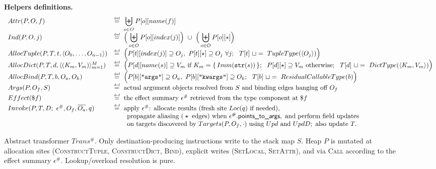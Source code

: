 \begin{figure*}[t]
\vspace{0.3em}
\textbf{Helpers definitions.}
\[
\begin{array}{ll}
Attr(P,O,f) &\defeq\ \displaystyle\biguplus_{o\in O} P[o][name(f)]
\\[0.2em]
Ind(P,O,j) &\defeq\ \displaystyle\Big(\biguplus_{o\in O} P[o][index(j)]\Big)\ \cup\ \Big(\biguplus_{o\in O} P[o][\star]\Big)
\\[0.2em]
AllocTuple(P,T,t,\langle O_0,\ldots,O_{n-1}\rangle)
  &\defeq\ \Big(P[t][index(j)] \supseteq O_j,\ P[t][\star]\supseteq O_j\ \forall j;\ \ T[t]\ \sqcup=\ TupleType(\langle O_j\rangle)\Big)
\\[0.2em]
AllocDict(P,T,d,\langle (K_m,V_m)\rangle_{m=1}^M)
  &\defeq\ \Big(P[d][name(s)] \supseteq V_m\ \text{if } K_m=\{\,Imm(\texttt{str}(s))\,\};\ \ P[d][\star]\supseteq V_m\ \text{otherwise};\ \ T[d]\ \sqcup=\ DictType(\langle K_m,V_m\rangle)\Big)
\\[0.2em]
AllocBind(P,T,b,O_a,O_k)
  &\defeq\ \Big(P[b][\texttt{"args"}]\supseteq O_a,\ P[b][\texttt{"kwargs"}]\supseteq O_k;\ \ T[b]\ \sqcup=\ ResidualCallableType(b)\Big)
\\[0.2em]
Args(P,O_f,S)
  &\defeq\ \text{actual argument objects resolved from }S\text{ and binding edges hanging off }O_f
\\[0.2em]
Effect(\$f)
  &\defeq\ \text{the effect summary }\epsilon^\#\text{ retrieved from the type component at }\$f
\\[0.2em]
Invoke(P,T,D;\ \epsilon^\#,O_f,\overline{O_a},q)
  &\defeq\ \text{apply }\epsilon^\#\text{: allocate results (fresh site } Loc(q)\text{ if needed),}\\
  &\qquad\text{propagate aliasing (}\star\text{ edges) when }\epsilon^\#.\textsf{points\_to\_args},\ \text{and perform field updates}\\
  &\qquad\text{on targets discovered by }Targets(P,O_f,\cdot)\text{ using } Upd \text{ and } UpdD; \text{ also update }T.
\end{array}
\]
\caption{Abstract transformer \(Trans^\#\).
Only destination-producing instructions write to the stack map \(S\).
Heap \(P\) is mutated at allocation sites (\textsc{ConstructTuple}, \textsc{ConstructDict}, \textsc{Bind}), explicit writes (\textsc{SetLocal}, \textsc{SetAttr}), and via \textsc{Call} according to the effect summary \(\epsilon^\#\).
Lookup/overload resolution is pure.}
\label{fig:tac-transfers-oneliner}
\end{figure*}


